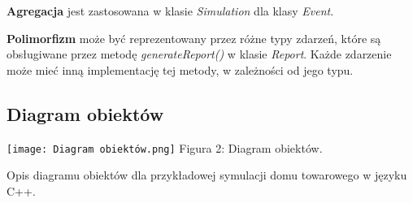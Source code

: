 \documentclass[11pt]{article}
\begin{document}
\textbf{Agregacja} jest zastosowana w klasie \textit{Simulation} dla klasy \textit{Event}.
\vspace{1pt}

\textbf{Polimorfizm} może być reprezentowany przez różne typy zdarzeń, które są obsługiwane przez metodę \textit{generateReport()} w klasie \textit{Report}. Każde zdarzenie może mieć inną implementację tej metody, w zależności od jego typu.

\newpage

\subsection{Diagram obiektów}

\begin{center}
    \texttt{[image: Diagram obiektów.png]}
    Figura 2: Diagram obiektów.
\end{center}

Opis diagramu obiektów dla przykładowej symulacji domu towarowego w języku C++.
\end{document}
